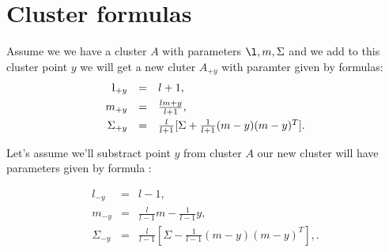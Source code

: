 \documentclass[10pt,a4paper]{article}
\def\m{m}
\begin{document}
\section{Cluster formulas}
Assume we we have a cluster $A$ with parameters $\l,\m,\Sigma$ and we add to this cluster point $y$ we will get a new cluter $A_{+y}$ with paramter given by formulas:
$$

\begin{array}{rcl}

\l_{+y} & = & l+1, \\[1ex]

\m_{+y} & = & \frac{l\m+y}{l+1}, \\[1ex]

\Sigma_{+y} & = & \frac{l}{l+1}[\Sigma+\frac{1}{l+1}(\m-y)(\m-y)^T].

\end{array}

$$

Let's assume we'll substract point $ y $ from cluster $A$ our new cluster will have parameters given by formula :

$$

\begin{array}{rcl}

l_{-y} & = & l-1, \\[1ex]

\m_{-y} & = & \frac{l}{l-1}\m-\frac{1}{l-1} y, \\[1ex]

\Sigma_{-y} & = & \frac{l}{l-1}[\Sigma-\frac{1}{l-1}(\m-y)(\m-y)^T], .

\end{array}

$$
\end{document}
